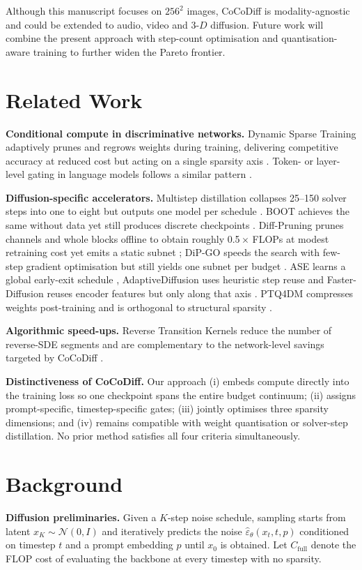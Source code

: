 \documentclass{article} %
\begin{document}
Although this manuscript focuses on \(256^{2}\) images, CoCoDiff is modality-agnostic and could be extended to audio, video and \(3\text{-}D\) diffusion. Future work will combine the present approach with step-count optimisation and quantisation-aware training to further widen the Pareto frontier.

\section{Related Work}
\label{sec:related}
\textbf{Conditional compute in discriminative networks.} Dynamic Sparse Training adaptively prunes and regrows weights during training, delivering competitive accuracy at reduced cost but acting on a single sparsity axis \cite{nowak_2023_fantastic}. Token- or layer-level gating in language models follows a similar pattern \cite{author_year_leveraging}.

\textbf{Diffusion-specific accelerators.} Multistep distillation collapses 25–150 solver steps into one to eight but outputs one model per schedule \cite{salimans_2024_multistep}. BOOT achieves the same without data yet still produces discrete checkpoints \cite{gu_2023_data}. Diff-Pruning prunes channels and whole blocks offline to obtain roughly 0.5\,\(\times\) FLOPs at modest retraining cost yet emits a static subnet \cite{fang_2023_structural}; DiP-GO speeds the search with few-step gradient optimisation but still yields one subnet per budget \cite{zhu_2024_dip}. ASE learns a global early-exit schedule \cite{moon_2024_simple}, AdaptiveDiffusion uses heuristic step reuse \cite{ye_2024_training} and Faster-Diffusion reuses encoder features but only along that axis \cite{li_2023_faster}. PTQ4DM compresses weights post-training and is orthogonal to structural sparsity \cite{shang_2022_post}.

\textbf{Algorithmic speed-ups.} Reverse Transition Kernels reduce the number of reverse-SDE segments and are complementary to the network-level savings targeted by CoCoDiff \cite{huang_2024_reverse}.

\textbf{Distinctiveness of CoCoDiff.} Our approach (i) embeds compute directly into the training loss so one checkpoint spans the entire budget continuum; (ii) assigns prompt-specific, timestep-specific gates; (iii) jointly optimises three sparsity dimensions; and (iv) remains compatible with weight quantisation or solver-step distillation. No prior method satisfies all four criteria simultaneously.

\section{Background}
\label{sec:background}
\textbf{Diffusion preliminaries.} Given a \(K\)-step noise schedule, sampling starts from latent \(x_{K}\sim\mathcal{N}(0,I)\) and iteratively predicts the noise \(\hat{\varepsilon}_{\theta}(x_{t},t,p)\) conditioned on timestep \(t\) and a prompt embedding \(p\) until \(x_{0}\) is obtained. Let \(C_{\text{full}}\) denote the FLOP cost of evaluating the backbone at every timestep with no sparsity.
\end{document}

